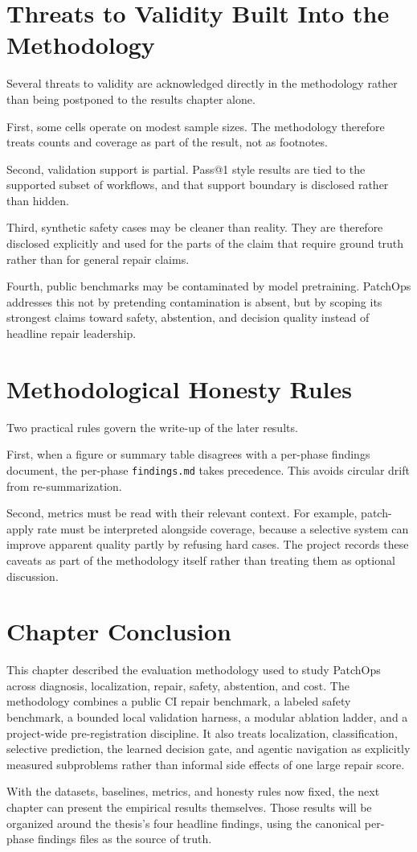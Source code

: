 \section{Threats to Validity Built Into the Methodology}

Several threats to validity are acknowledged directly in the methodology rather than being postponed to the
results chapter alone.

First, some cells operate on modest sample sizes. The methodology therefore treats counts and coverage as part
of the result, not as footnotes.

Second, validation support is partial. Pass@1 style results are tied to the supported subset of workflows, and
that support boundary is disclosed rather than hidden.

Third, synthetic safety cases may be cleaner than reality. They are therefore disclosed explicitly and used for
the parts of the claim that require ground truth rather than for general repair claims.

Fourth, public benchmarks may be contaminated by model pretraining. PatchOps addresses this not by pretending
contamination is absent, but by scoping its strongest claims toward safety, abstention, and decision quality
instead of headline repair leadership.

\section{Methodological Honesty Rules}

Two practical rules govern the write-up of the later results.

First, when a figure or summary table disagrees with a per-phase findings document, the per-phase
\texttt{findings.md} takes precedence. This avoids circular drift from re-summarization.

Second, metrics must be read with their relevant context. For example, patch-apply rate must be interpreted
alongside coverage, because a selective system can improve apparent quality partly by refusing hard cases. The
project records these caveats as part of the methodology itself rather than treating them as optional
discussion.

\section{Chapter Conclusion}

This chapter described the evaluation methodology used to study PatchOps across diagnosis, localization, repair,
safety, abstention, and cost. The methodology combines a public CI repair benchmark, a labeled safety benchmark,
a bounded local validation harness, a modular ablation ladder, and a project-wide pre-registration discipline.
It also treats localization, classification, selective prediction, the learned decision gate, and agentic
navigation as explicitly measured subproblems rather than informal side effects of one large repair score.

With the datasets, baselines, metrics, and honesty rules now fixed, the next chapter can present the empirical
results themselves. Those results will be organized around the thesis's four headline findings, using the
canonical per-phase findings files as the source of truth.

